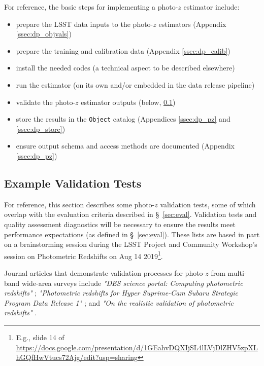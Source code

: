 \documentclass[DM,lsstdraft,toc]{lsstdoc}
\begin{document}
For reference, the basic steps for implementing a photo-$z$ estimator include:
\vspace{-15pt}
\begin{itemize}
\item prepare the LSST data inputs to the photo-$z$ estimators (Appendix \ref{ssec:dp_objvals})
\item prepare the training and calibration data (Appendix \ref{ssec:dp_calib})
\item install the needed codes (a technical aspect to be described elsewhere)
\item run the estimator (on its own and/or embedded in the data release pipeline)
\item validate the photo-$z$ estimator outputs (below, \ref{ssec:imp_val})
\item store the results in the {\tt Object} catalog (Appendices \ref{ssec:dp_pz} and \ref{ssec:dp_store})
\item ensure output schema and access methods are documented (Appendix \ref{ssec:dp_pz})
\end{itemize}

\subsection{Example Validation Tests}\label{ssec:imp_val}

For reference, this section describes some photo-$z$ validation tests, some of which overlap with the evaluation criteria described in \S~\ref{sec:eval}. 
Validation tests and quality assessment diagnostics will be necessary to ensure the results meet performance expectations (as defined in \S~\ref{sec:eval}).
These lists are based in part on a brainstorming session during the LSST Project and Community Workshop's session on Photometric Redshifts on Aug 14 2019\footnote{E.g., slide 14 of \url{https://docs.google.com/presentation/d/1GEahvDQXIjSL4lLVjDlZHV5zpXLhGQfHwVtucs72Ajg/edit?usp=sharing}}.

Journal articles that demonstrate validation processes for photo-$z$ from multi-band wide-area surveys include {\it "DES science portal: Computing photometric redshifts"} \citep{2018A&C....25...58G}; {\it "Photometric redshifts for Hyper Suprime-Cam Subaru Strategic Program Data Release 1"} \citep{2018PASJ...70S...9T}; and {\it "On the realistic validation of photometric redshifts"} \citep{2017MNRAS.468.4323B}. 
\end{document}
